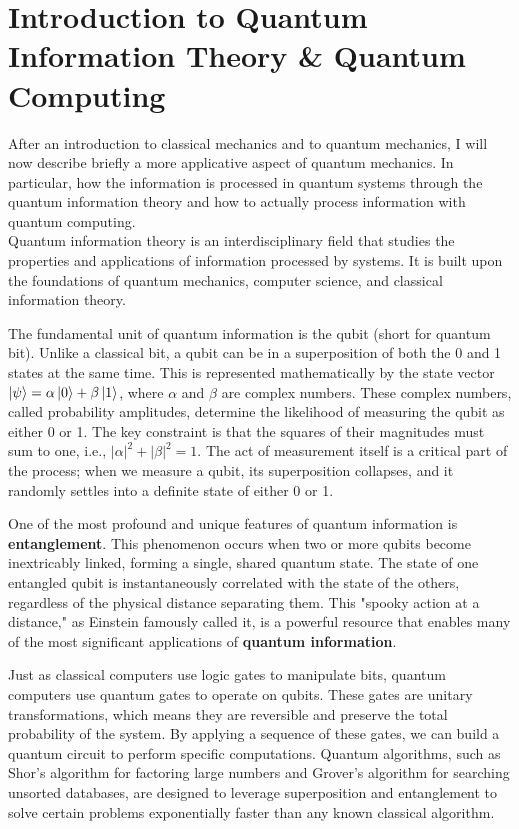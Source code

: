 \documentclass{article}
\begin{document}
\section{Introduction to Quantum Information Theory \& Quantum Computing}
After an introduction to classical mechanics and to quantum mechanics, I will now describe briefly a more applicative aspect of quantum mechanics. In particular, how the information is processed in quantum systems through the quantum information theory and how to actually process information with quantum computing.\\
Quantum information theory is an interdisciplinary field that studies the properties and applications of information processed by systems. It is built upon the foundations of quantum mechanics, computer science, and classical information theory.

The fundamental unit of quantum information is the qubit (short for quantum bit). Unlike a classical bit, a qubit can be in a superposition of both the 0 and 1 states at the same time. This is represented mathematically by the state vector $\ket{\psi}=\alpha \ket{0} + \beta \ket{1}$, where $\alpha$ and $\beta$ are complex numbers. These complex numbers, called probability amplitudes, determine the likelihood of measuring the qubit as either 0 or 1. The key constraint is that the squares of their magnitudes must sum to one, i.e., $|\alpha|^2 + |\beta|^2 = 1$. The act of measurement itself is a critical part of the process; when we measure a qubit, its superposition collapses, and it randomly settles into a definite state of either 0 or 1.

One of the most profound and unique features of quantum information is \textbf{entanglement}. This phenomenon occurs when two or more qubits become inextricably linked, forming a single, shared quantum state. The state of one entangled qubit is instantaneously correlated with the state of the others, regardless of the physical distance separating them. This "spooky action at a distance," as Einstein famously called it, is a powerful resource that enables many of the most significant applications of \textbf{quantum information}.

Just as classical computers use logic gates to manipulate bits, quantum computers use quantum gates to operate on qubits. These gates are unitary transformations, which means they are reversible and preserve the total probability of the system. By applying a sequence of these gates, we can build a quantum circuit to perform specific computations. Quantum algorithms, such as Shor's algorithm for factoring large numbers and Grover's algorithm for searching unsorted databases, are designed to leverage superposition and entanglement to solve certain problems exponentially faster than any known classical algorithm.
\end{document}
